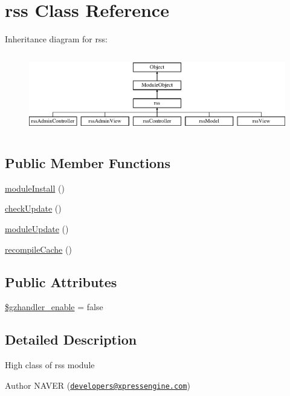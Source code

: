 \hypertarget{classrss}{}\section{rss Class Reference}
\label{classrss}
Inheritance diagram for rss\+:\begin{figure}[H]
\begin{center}
\leavevmode
\includegraphics[height=3.500000cm]{classrss}
\end{center}
\end{figure}
\subsection*{Public Member Functions}
\begin{DoxyCompactItemize}
\item 
\hyperlink{classrss_a6730f54dbfe8b8d31066f3658f02185b}{module\+Install} ()
\item 
\hyperlink{classrss_abea52ff499087ead7116c986080a685a}{check\+Update} ()
\item 
\hyperlink{classrss_a68d8a7c97f3afd095c5ed5c1a304e8e5}{module\+Update} ()
\item 
\hyperlink{classrss_a422550360916bdd9ced66d334f75f3a9}{recompile\+Cache} ()
\end{DoxyCompactItemize}
\subsection*{Public Attributes}
\begin{DoxyCompactItemize}
\item 
\hyperlink{classrss_a46ac0a6862b1dc4dcc4a9db2b9c1b442}{\$gzhandler\+\_\+enable} = false
\end{DoxyCompactItemize}


\subsection{Detailed Description}
High class of rss module

\begin{DoxyAuthor}{Author}
N\+A\+V\+ER (\href{mailto:developers@xpressengine.com}{\tt developers@xpressengine.\+com}) 
\end{DoxyAuthor}


